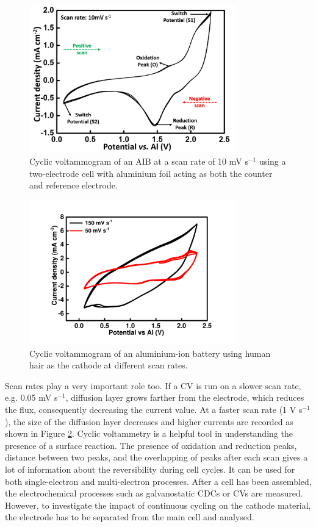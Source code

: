 \begin{figure}[tbh!]
\centering
\includegraphics[width=0.8\textwidth]{Figures/chap2fig/CV.pdf}
\caption{Cyclic voltammogram of an AIB at a scan rate of 10 mV s$^{-1}$ using a two-electrode cell with aluminium foil acting as both the counter and reference electrode.}
\label{Figures/chap2fig:CV}
\end{figure}

\begin{figure}[tbh!]
\centering
\includegraphics[width=0.8\textwidth]{Figures/chap2fig/scanrate.pdf}
\caption{Cyclic voltammogram of an aluminium-ion battery using human hair as the cathode at different scan rates.}
\label{Figures/chap2fig:scanrate}
\end{figure}

Scan rates play a very important role too. If a CV is run on a slower scan rate, e.g. 0.05 mV s$^{-1}$, diffusion layer grows farther from the electrode, which reduces the flux, consequently decreasing the current value. At a faster scan rate (1 V s$^{-1}$), the size of the diffusion layer decreases and higher currents are recorded as shown in Figure \ref{Figures/chap2fig:scanrate}. Cyclic voltammetry is a helpful tool in understanding the presence of a surface reaction. The presence of oxidation and reduction peaks, distance between two peaks, and the overlapping of peaks after each scan gives a lot of information about the reversibility during cell cycles. It can be used for both single-electron and multi-electron processes.  
After a cell has been assembled, the electrochemical processes such as galvanostatic CDCs or CVs are measured. However, to investigate the impact of continuous cycling on the cathode material, the electrode has to be separated from the main cell and analysed. 
